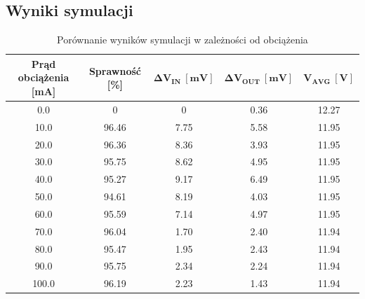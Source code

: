 \documentclass[11pt]{article}
\begin{document}
\subsection{Wyniki symulacji}
\begin{table}[H]
    \centering
    \caption{Porównanie wyników symulacji w zależności od obciążenia}
    \label{tab:efficiency_ripple}
    \begin{tabular}{ccccc}
        \toprule
        \textbf{Prąd obciążenia [mA]} & \textbf{Sprawność [\%]} & $\mathbf{\Delta{V_{IN}} \ [mV]}$ & $\mathbf{\Delta{V_{OUT}} \ [mV]}$ & $\mathbf{V_{AVG} \ [V]}$ \\
        \midrule
        0.0                           & 0                       & 0                                & 0.36                              & 12.27                    \\
        10.0                          & 96.46                   & 7.75                             & 5.58                              & 11.95                    \\
        20.0                          & 96.36                   & 8.36                             & 3.93                              & 11.95                    \\
        30.0                          & 95.75                   & 8.62                             & 4.95                              & 11.95                    \\
        40.0                          & 95.27                   & 9.17                             & 6.49                              & 11.95                    \\
        50.0                          & 94.61                   & 8.19                             & 4.03                              & 11.95                    \\
        60.0                          & 95.59                   & 7.14                             & 4.97                              & 11.95                    \\
        70.0                          & 96.04                   & 1.70                             & 2.40                              & 11.94                    \\
        80.0                          & 95.47                   & 1.95                             & 2.43                              & 11.94                    \\
        90.0                          & 95.75                   & 2.34                             & 2.24                              & 11.94                    \\
        100.0                         & 96.19                   & 2.23                             & 1.43                              & 11.94                    \\
        \bottomrule
    \end{tabular}
\end{table}
\end{document}

